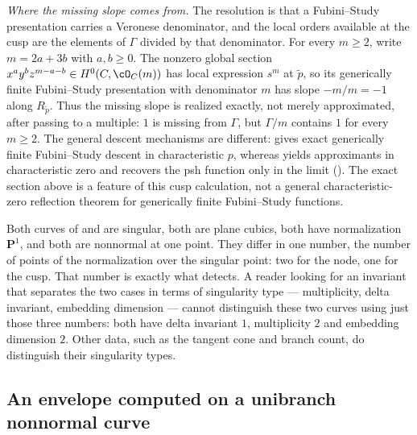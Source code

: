 \begin{example}
\emph{Where the missing slope comes from.}  The resolution is that a
Fubini--Study presentation carries a Veronese denominator, and the local
orders available at the cusp are the elements of $\Gamma$ divided by that
denominator.  For every $m\ge2$, write $m=2a+3b$ with $a,b\ge0$.
The nonzero global section
$x^ay^bz^{m-a-b}\in H^0(C,\cO_C(m))$ has local expression $s^m$ at
$\tilde p$, so its generically finite Fubini--Study presentation with
denominator $m$ has slope
$-m/m=-1$ along $R_{\tilde p}$.  Thus the missing slope is realized
exactly, not merely approximated, after passing to a multiple: $1$ is
missing from $\Gamma$, but $\Gamma/m$ contains $1$ for every $m\ge2$.  The general
descent mechanisms are different:  gives
exact generically finite Fubini--Study descent in characteristic $p$,
whereas  yields approximants in
characteristic zero and recovers the psh function only in the limit
().  The exact section above is a
feature of this cusp calculation, not a general characteristic-zero
reflection theorem for generically finite Fubini--Study functions.
\end{example}

\begin{remark}
\label{rem:ch45-branch-not-smooth}
Both curves of  and
 are singular, both are plane cubics, both have
normalization $\mathbf P^1$, and both are nonnormal at one point.  They
differ in one number, the number of points of the normalization over the
singular point: two for the node, one for the cusp.  That number is exactly
what  detects.  A reader
looking for an invariant that separates the two cases in terms of
singularity type --- multiplicity, delta invariant, embedding dimension ---
cannot distinguish these two curves using just those three numbers:
both have delta invariant $1$, multiplicity $2$ and embedding dimension
$2$.  Other data, such as the tangent cone and branch count, do distinguish
their singularity types.
\end{remark}

\subsection{An envelope computed on a unibranch nonnormal curve}
\label{sec:ch45-cuspidal-envelope}

